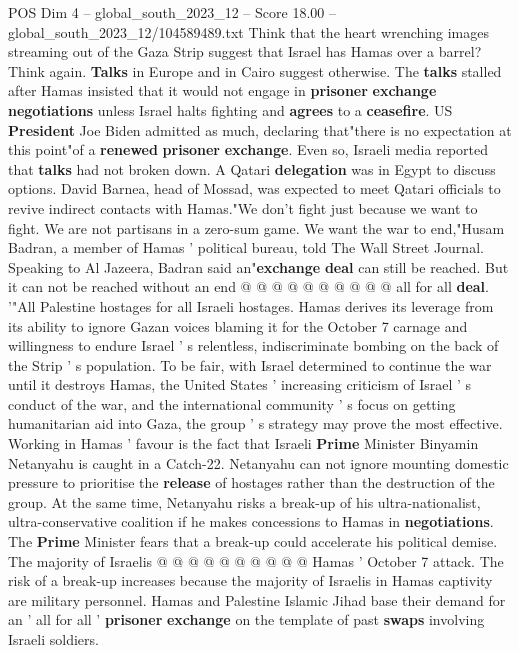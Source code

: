 \begin{textsample}{POS Dim 4 – global\_south\_2023\_12 – Score 18.00 – global\_south\_2023\_12/104589489.txt}  \label{ex:f4_pos_145}
Think that the heart wrenching images streaming out of the Gaza Strip suggest that Israel has Hamas over a barrel?
Think again. \textbf{Talks} in Europe and in Cairo suggest otherwise.
The \textbf{talks} stalled after Hamas insisted that it would not engage in \textbf{prisoner} \textbf{exchange} \textbf{negotiations} unless Israel halts fighting and \textbf{agrees} to a \textbf{ceasefire}.
US \textbf{President} Joe Biden admitted as much, declaring that"there is no expectation at this point"of a \textbf{renewed} \textbf{prisoner} \textbf{exchange}.
Even so, Israeli media reported that \textbf{talks} had not broken down.
A Qatari \textbf{delegation} was in Egypt to discuss options.
David Barnea, head of Mossad, was expected to meet Qatari officials to revive indirect contacts with Hamas."We don't fight just because we want to fight.
We are not partisans in a zero-sum game.
We want the war to end,"Husam Badran, a member of Hamas ' political bureau, told The Wall Street Journal.
Speaking to Al Jazeera, Badran said an"\textbf{exchange} \textbf{deal} can still be reached.
But it can not be reached without an end @ @ @ @ @ @ @ @ @ @ all for all \textbf{deal}. '"All Palestine hostages for all Israeli hostages.
Hamas derives its leverage from its ability to ignore Gazan voices blaming it for the October 7 carnage and willingness to endure Israel ' s relentless, indiscriminate bombing on the back of the Strip ' s population.
To be fair, with Israel determined to continue the war until it destroys Hamas, the United States ' increasing criticism of Israel ' s conduct of the war, and the international community ' s focus on getting humanitarian aid into Gaza, the group ' s strategy may prove the most effective.
Working in Hamas ' favour is the fact that Israeli \textbf{Prime} Minister Binyamin Netanyahu is caught in a Catch-22.
Netanyahu can not ignore mounting domestic pressure to prioritise the \textbf{release} of hostages rather than the destruction of the group.
At the same time, Netanyahu risks a break-up of his ultra-nationalist, ultra-conservative coalition if he makes concessions to Hamas in \textbf{negotiations}.
The \textbf{Prime} Minister fears that a break-up could accelerate his political demise.
The majority of Israelis @ @ @ @ @ @ @ @ @ @ Hamas ' October 7 attack.
The risk of a break-up increases because the majority of Israelis in Hamas captivity are military personnel.
Hamas and Palestine Islamic Jihad base their demand for an ' all for all ' \textbf{prisoner} \textbf{exchange} on the template of past \textbf{swaps} involving Israeli soldiers.

\end{textsample}
